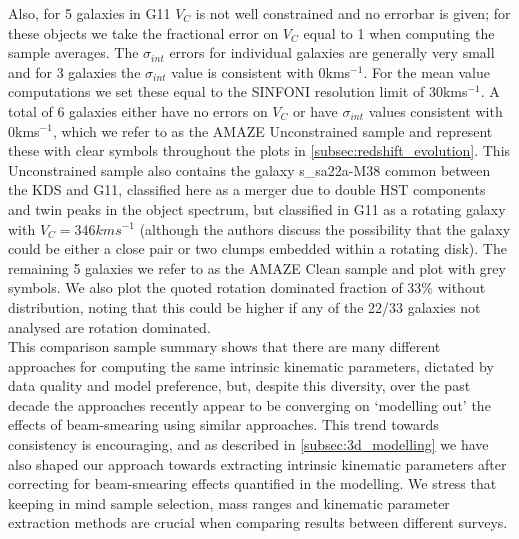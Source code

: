 \documentclass[fleqn,usenatbib]{mn2e}
\begin{document}
Also, for 5 galaxies in G11 $V_{C}$ is not well constrained and no errorbar is given; for these objects we take the fractional error on $V_{C}$ equal to 1 when computing the sample averages.
The $\sigma_{int}$ errors for individual galaxies are generally very small and for 3 galaxies the $\sigma_{int}$ value is consistent with 0kms$^{-1}$.
For the mean value computations we set these equal to the SINFONI resolution limit of 30kms$^{-1}$.
A total of 6 galaxies either have no errors on $V_{C}$ or have $\sigma_{int}$ values consistent with 0kms$^{-1}$, which we refer to as the AMAZE Unconstrained sample and represent these with clear symbols throughout the plots in \cref{subsec:redshift_evolution}.
This Unconstrained sample also contains the galaxy s\_sa22a-M38 common between the KDS and G11, classified here as a merger due to double HST components and twin peaks in the object spectrum, but classified in G11 as a rotating galaxy with $V_{C} = 346kms^{-1}$ (although the authors discuss the possibility that the galaxy could be either a close pair or two clumps embedded within a rotating disk).
The remaining 5 galaxies we refer to as the AMAZE Clean sample and plot with grey symbols.
We also plot the quoted rotation dominated fraction of 33$\%$ without distribution, noting that this could be higher if any of the 22/33 galaxies not analysed are rotation dominated. \\
 
This comparison sample summary shows that there are many different approaches for computing the same intrinsic kinematic parameters, dictated by data quality and model preference, but, despite this diversity, over the past decade the approaches recently appear to be converging on `modelling out' the effects of beam-smearing using similar approaches.
This trend towards consistency is encouraging, and as described in \cref{subsec:3d_modelling} we have also shaped our approach towards extracting intrinsic kinematic parameters after correcting for beam-smearing effects quantified in the modelling.
We stress that keeping in mind sample selection, mass ranges and kinematic parameter extraction methods are crucial when comparing results between different surveys.
\end{document}
